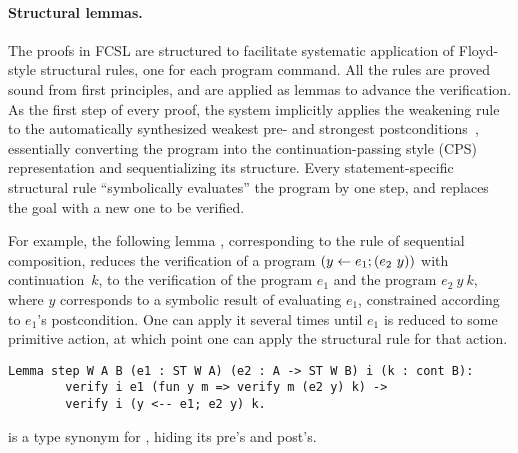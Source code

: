 %
%
%
%

\paragraph{Structural lemmas.~~}
\label{sec:lemmas}

The proofs in FCSL are structured to facilitate systematic application
of Floyd-style structural rules, one for each program command. All the
rules are proved sound from first principles, and are applied as
lemmas to advance the verification.
%
As the first step of every proof, the system implicitly applies the
weakening rule to the automatically synthesized weakest pre- and
strongest postconditions~\cite{Dijkstra:CACM75}, essentially
converting the program into the continuation-passing style (CPS)
representation and sequentializing its structure.
%
Every statement-specific structural rule ``symbolically evaluates''
the program by one step, and replaces the goal with a new one to be
verified.

For example, the following lemma , corresponding to the
rule of sequential composition, reduces the verification of a program
$(y \leftarrow e_1; (e_2~y))$ with continuation~$k$, to the verification
of the program $e_1$ and the program $e_2~y~k$, where $y$ corresponds
to a symbolic result of evaluating $e_1$, constrained according to
$e_1$'s postcondition. One can apply it several times until $e_1$ is
reduced to some primitive action, at which point one can apply the
structural rule for that action.
%
\begin{lstlisting}
Lemma step W A B (e1 : ST W A) (e2 : A -> ST W B) i (k : cont B): 
        verify i e1 (fun y m => verify m (e2 y) k) ->
        verify i (y <-- e1; e2 y) k.  
\end{lstlisting}
%
 is a type synonym for , hiding its pre's and
post's.





